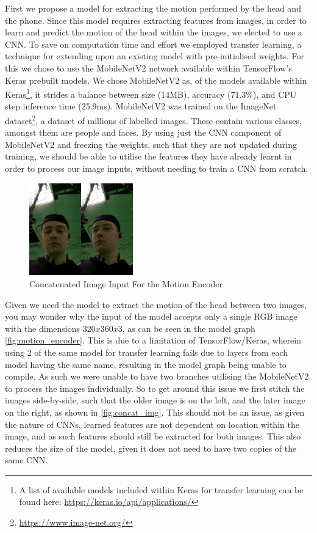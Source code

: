 First we propose a model for extracting the motion performed by the head and the phone.
Since this model requires extracting features from images, in order to learn and predict the motion of the head within the images, we elected to use a CNN.
To save on computation time and effort we employed transfer learning, a technique for extending upon an existing model with pre-initialised weights. For this we chose to use the MobileNetV2 network available within TensorFlow's Keras prebuilt models. We chose MobileNetV2 as, of the models available within Keras\footnote{A list of available models included within Keras for transfer learning can be found here: \url{https://keras.io/api/applications/}}, it strides a balance between size (14MB), accuracy (71.3\%), and CPU step inference time (25.9ms).
MobileNetV2 was trained on the ImageNet dataset\footnote{\url{https://www.image-net.org/}}, a dataset of millions of labelled images. These contain various classes, amongst them are people and faces.
By using just the CNN component of MobileNetV2 and freezing the weights, such that they are not updated during training, we should be able to utilise the features they have already learnt in order to process our image inputs, without needing to train a CNN from scratch.

\begin{figure}
    \centering
    \includegraphics[width=0.4\textwidth]{figures/concat_input.png}
    \caption{\label{fig:concat_img} Concatenated Image Input For the Motion Encoder}
\end{figure}
Given we need the model to extract the motion of the head between two images, you may wonder why the input of the model accepts only a single RGB image with the dimensions $320x360x3$, as can be seen in the model graph \autoref{fig:motion_encoder}.
This is due to a limitation of TensorFlow/Keras, wherein using 2 of the same model for transfer learning fails due to layers from each model having the same name, resulting in the model graph being unable to compile. As such we were unable to have two branches utilising the MobileNetV2 to process the images individually. So to get around this issue we first stitch the images side-by-side, such that the older image is on the left, and the later image on the right, as shown in \autoref{fig:concat_img}.
This should not be an issue, as given the nature of CNNs, learned features are not dependent on location within the image, and as such features should still be extracted for both images. This also reduces the size of the model, given it does not need to have two copies of the same CNN.

